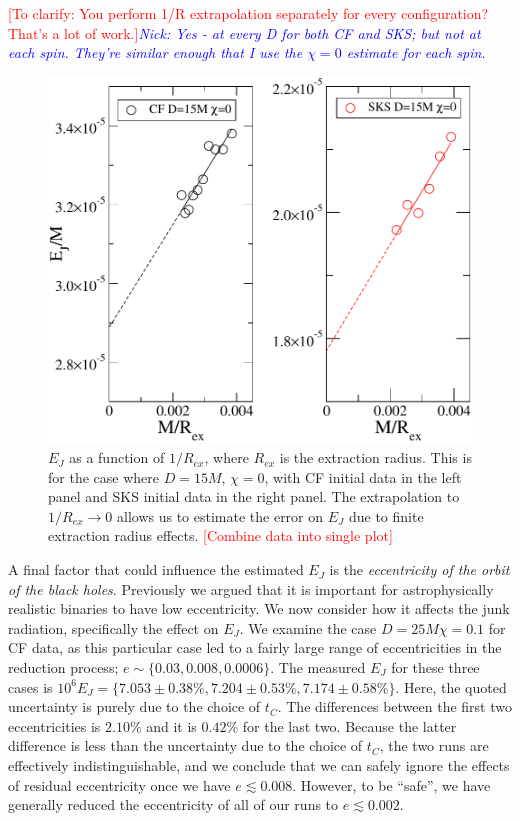\documentclass[aps,prd,amsmath,floatfix,twocolumn,superscriptaddress,nofootinbib,showpacs]{revtex4-1}
\theoremstyle{plain}
\theoremstyle{definition}
\newcommand{\red}[1]{\textcolor{Red}{#1}}
\newcommand{\nick}[1]{\textcolor{blue}{\textit{Nick: #1}}}
\begin{document}
\red{[To clarify: You perform 1/R extrapolation separately for every
  configuration? That's a lot of work.]}\nick{Yes - at every D for
  both CF and SKS; but not at each spin. They're similar enough that I
  use the $\chi=0$ estimate for each spin.}

\begin{figure}
  \includegraphics[scale=0.42]{EvsRextr}
  \caption{$E_J$ as a function of $1/R_{ex}$, where $R_{ex}$ is the
    extraction radius. This is for the case where $D=15M$, $\chi=0$,
    with CF initial data in the left panel and SKS initial data in the
    right panel. The extrapolation
    to $1/R_{ex}\rightarrow 0$ allows us to estimate the error on
    $E_J$ due to finite extraction radius effects. 
    \red{[Combine data into single plot]} 
}
  \label{fig:EvsRextr}
\end{figure}

A final factor that could influence the estimated $E_J$ is the
{\em eccentricity of the orbit of the black holes}. Previously we argued
that it is important for astrophysically realistic binaries to have
low eccentricity. We now consider how it affects the junk radiation, specifically the effect on $E_J$. We examine the case $D=25M \chi=0.1$
for CF data, as this particular case led to a fairly large range of
eccentricities in the reduction process;
$e\sim\{0.03,0.008,0.0006\}$. The measured $E_J$ for these three cases
is $10^6E_J=\{7.053\pm0.38\%, 7.204\pm0.53\%, 7.174\pm0.58\%\}$. Here,
the quoted uncertainty is purely due to the choice of $t_C$. The
differences between the first two eccentricities is $2.10\%$ and it is
$0.42\%$ for the last two. Because the latter difference is less than
the uncertainty due to the choice of $t_C$, the two runs are
effectively indistinguishable, and we conclude that we can safely
ignore the effects of residual eccentricity once we have $e\lesssim
0.008$. However, to be ``safe'', we have generally reduced the
eccentricity of all of our runs to $e\lesssim 0.002$.
\end{document}
